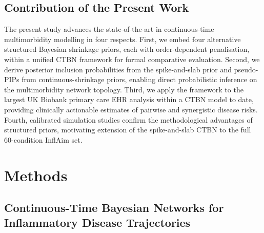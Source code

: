 \documentclass[12pt]{article}
\begin{document}
\subsection{Contribution of the Present Work}

The present study advances the state-of-the-art in continuous-time
multimorbidity modelling in four respects.  First, we embed four alternative
structured Bayesian shrinkage priors, each with order-dependent penalisation,
within a unified CTBN framework for formal comparative evaluation.  Second,
we derive posterior inclusion probabilities from the spike-and-slab prior and
pseudo-PIPs from continuous-shrinkage priors, enabling direct probabilistic
inference on the multimorbidity network topology.  Third, we apply the framework
to the largest UK Biobank primary care EHR analysis within a CTBN model to
date, providing clinically actionable estimates of pairwise and synergistic
disease risks.  Fourth, calibrated simulation studies confirm the methodological
advantages of structured priors, motivating extension of the spike-and-slab
CTBN to the full 60-condition InflAim set.


\section{Methods}
\label{sec:methods}

\subsection{Continuous-Time Bayesian Networks for Inflammatory Disease Trajectories}
\end{document}
